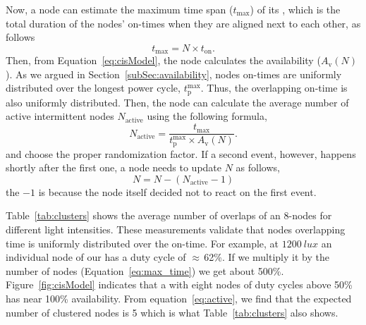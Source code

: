 Now, a node can estimate the maximum time span ($t_\text{max}$) of its \sys, which is the total duration of the nodes' on-times when they are aligned next to each other, as follows
\begin{equation}
t_\text{max} = N\times t_\text{on}.
		\label{eq:max_time}
\end{equation}
Then, from Equation~\ref{eq:cisModel}, the node calculates the \sys availability ($A_\text{v}(N)$). As we argued in Section~\ref{subSec:availability}, nodes on-times are uniformly distributed over the longest power cycle, $t_\text{p}^\text{max}$. Thus, the overlapping on-time is also uniformly distributed. Then, the node can calculate the average number of active intermittent nodes $N_\text{active}$ using the following formula,
\begin{equation}
	N_\text{active} = \frac{t_\text{max}}{t_\text{p}^\text{max}\times A_\text{v}(N)}.
	\label{eq:active}
\end{equation}
and choose the proper randomization factor. If a second event, however, happens shortly after the first one, a node needs to update $N$ as follows, 
$$
N = N - (N_\text{active}-1)
$$
the $-1$ is because the node itself decided not to react on the first event. 

Table~\ref{tab:clusters} shows the average number of overlaps of an 8-nodes \sys for different light intensities. These measurements validate that nodes overlapping time is uniformly distributed over the \sys on-time. For example, at $\SI{1200}{lux}$ an individual node of our \sys has a duty cycle of $\approx$\,62\%. If we multiply it by the number of nodes (Equation~\ref{eq:max_time}) we get about 500\%. Figure~\ref{fig:cisModel} indicates that a \sys with eight nodes of duty cycles above 50\% has near 100\% availability. From equation~\ref{eq:active}, we find that the expected number of clustered nodes is 5 which is what Table~\ref{tab:clusters} also shows. 







































